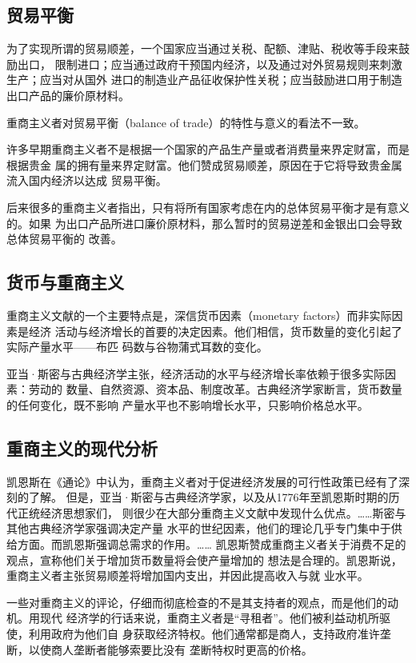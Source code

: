 \subsection{贸易平衡}

为了实现所谓的贸易顺差，一个国家应当通过关税、配额、津贴、税收等手段来鼓励出口，
限制进口；应当通过政府干预国内经济，以及通过对外贸易规则来刺激生产；应当对从国外
进口的制造业产品征收保护性关税；应当鼓励进口用于制造出口产品的廉价原材料。

重商主义者对贸易平衡（balance of trade）的特性与意义的看法不一致。

许多早期重商主义者不是根据一个国家的产品生产量或者消费量来界定财富，而是根据贵金
属的拥有量来界定财富。他们赞成贸易顺差，原因在于它将导致贵金属流入国内经济以达成
贸易平衡。

后来很多的重商主义者指出，只有将所有国家考虑在内的总体贸易平衡才是有意义的。如果
为出口产品所进口廉价原材料，那么暂时的贸易逆差和金银出口会导致总体贸易平衡的
改善。

\subsection{货币与重商主义}

重商主义文献的一个主要特点是，深信货币因素（monetary factors）而非实际因素是经济
活动与经济增长的首要的决定因素。他们相信，货币数量的变化引起了实际产量水平——布匹
码数与谷物蒲式耳数的变化。

亚当·斯密与古典经济学主张，经济活动的水平与经济增长率依赖于很多实际因素：劳动的
数量、自然资源、资本品、制度改革。古典经济学家断言，货币数量的任何变化，既不影响
产量水平也不影响增长水平，只影响价格总水平。

\subsection{重商主义的现代分析}

凯恩斯在《通论》中认为，重商主义者对于促进经济发展的可行性政策已经有了深刻的了解。
但是，亚当·斯密与古典经济学家，以及从1776年至凯恩斯时期的历代正统经济思想家们，
则很少在大部分重商主义文献中发现什么优点。……斯密与其他古典经济学家强调决定产量
水平的世纪因素，他们的理论几乎专门集中于供给方面。而凯恩斯强调总需求的作用。……
凯恩斯赞成重商主义者关于消费不足的观点，宣称他们关于增加货币数量将会使产量增加的
想法是合理的。凯恩斯说，重商主义者主张贸易顺差将增加国内支出，并因此提高收入与就
业水平。

一些对重商主义的评论，仔细而彻底检查的不是其支持者的观点，而是他们的动机。用现代
经济学的行话来说，重商主义者是“寻租者”。他们被利益动机所驱使，利用政府为他们自
身获取经济特权。他们通常都是商人，支持政府准许垄断，以使商人垄断者能够索要比没有
垄断特权时更高的价格。


